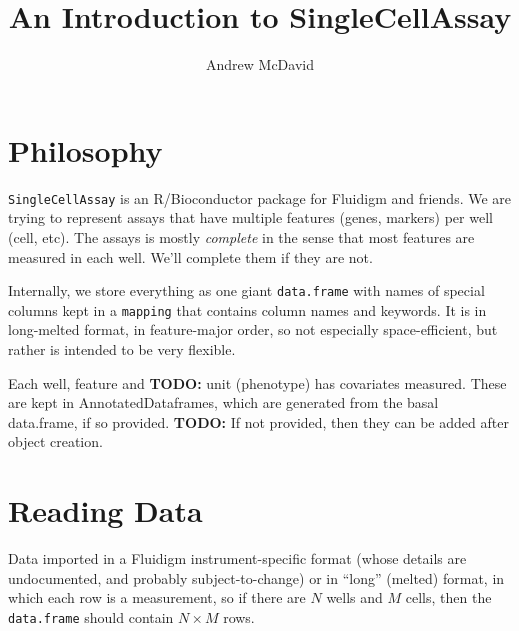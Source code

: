 \documentclass{article}\usepackage{graphicx, color}
\newcommand{\future}[1]{\textbf{TODO:} #1}
\begin{document}
\title{An Introduction to SingleCellAssay}


\author{Andrew McDavid}

\maketitle
\section{Philosophy}
 \texttt{SingleCellAssay} is an R/Bioconductor package for Fluidigm and friends. 
We are trying to represent assays that have multiple features (genes, markers) per well (cell, etc). 
The assays is mostly \emph{complete} in the sense that most features are measured in each well. 
We'll complete them if they are not.

Internally, we store everything as one giant \texttt{data.frame} with names of special columns kept in a \texttt{mapping} that contains column names and keywords.  
It is in long-melted format, in feature-major order, so not especially space-efficient, but rather is intended to be very flexible.

Each well, feature and \future{unit (phenotype)} has covariates measured.
These are kept in AnnotatedDataframes, which are generated from the basal data.frame, if so provided.
\future{If not provided, then they can be added after object creation.}

\section{Reading Data}
Data imported in a Fluidigm instrument-specific format (whose details are undocumented, and probably subject-to-change) or in ``long'' (melted) format, in which each row is a measurement, so if there are $N$ wells and $M$ cells, then the \texttt{data.frame} should contain $N \times M$ rows.
\end{document}
